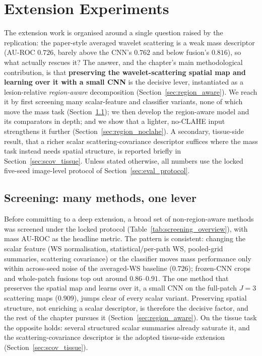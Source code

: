 
\chapter{Extension Experiments} \label{sec:extensions}

The extension work is organised around a single question raised by the replication: the paper-style averaged wavelet scattering is a weak mass descriptor (AU-ROC $0.726$, barely above the CNN's $0.762$ and below fusion's $0.816$), so what actually rescues it? The answer, and the chapter's main methodological contribution, is that \textbf{preserving the wavelet-scattering spatial map and learning over it with a small CNN} is the decisive lever, instantiated as a lesion-relative \emph{region-aware} decomposition (Section~\ref{sec:region_aware}). We reach it by first screening many scalar-feature and classifier variants, none of which move the mass task (Section~\ref{sec:screening}); we then develop the region-aware model and its comparators in depth; and we show that a lighter, no-CLAHE input strengthens it further (Section~\ref{sec:region_noclahe}). A secondary, tissue-side result, that a richer scalar scattering-covariance descriptor suffices where the mass task instead needs spatial structure, is reported briefly in Section~\ref{sec:scov_tissue}. Unless stated otherwise, all numbers use the locked five-seed image-level protocol of Section~\ref{sec:eval_protocol}.

\section{Screening: many methods, one lever} \label{sec:screening}

Before committing to a deep extension, a broad set of non-region-aware methods was screened under the locked protocol (Table~\ref{tab:screening_overview}), with mass AU-ROC as the headline metric. The pattern is consistent: changing the scalar feature (WS normalisation, statistical/per-path WS, pooled-grid summaries, scattering covariance) or the classifier moves mass performance only within across-seed noise of the averaged-WS baseline ($0.726$); frozen-CNN crops and whole-patch fusions top out around $0.86$--$0.91$. The one method that preserves the spatial map and learns over it, a small CNN on the full-patch $J=3$ scattering maps ($0.909$), jumps clear of every scalar variant. Preserving spatial structure, not enriching a scalar descriptor, is therefore the decisive factor, and the rest of the chapter pursues it (Section~\ref{sec:region_aware}). On the tissue task the opposite holds: several structured scalar summaries already saturate it, and the scattering-covariance descriptor is the adopted tissue-side extension (Section~\ref{sec:scov_tissue}).

